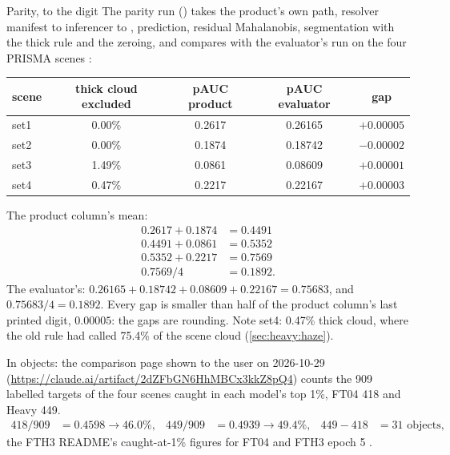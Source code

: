 \begin{worked}[label={we:heavy:parity}]{Parity, to the digit}
The parity run () takes the product's own path, resolver manifest to
inferencer to , prediction, residual Mahalanobis, segmentation with the thick rule and the zeroing,
and compares with the evaluator's run on the four PRISMA scenes :
\begin{center}\small
\begin{tabular}{lcccc}
\toprule
scene & thick cloud excluded & pAUC product & pAUC evaluator & gap\\
\midrule
set1 & 0.00\% & 0.2617 & 0.26165 & $+0.00005$\\
set2 & 0.00\% & 0.1874 & 0.18742 & $-0.00002$\\
set3 & 1.49\% & 0.0861 & 0.08609 & $+0.00001$\\
set4 & 0.47\% & 0.2217 & 0.22167 & $+0.00003$\\
\bottomrule
\end{tabular}
\end{center}
The product column's mean:
\begin{align*}
0.2617+0.1874 &= 0.4491\\
0.4491+0.0861 &= 0.5352\\
0.5352+0.2217 &= 0.7569\\
0.7569/4 &= 0.1892 .
\end{align*}
The evaluator's: $0.26165+0.18742+0.08609+0.22167=0.75683$, and $0.75683/4=0.1892$. Every gap is smaller than
half of the product column's last printed digit, $0.00005$: the gaps are rounding. Note set4: 0.47\% thick cloud,
where the old rule had called 75.4\% of the scene cloud (\cref{sec:heavy:haze}).
\end{worked}

In objects: the comparison page shown to the user on 2026-10-29 (\url{https://claude.ai/artifact/2dZFbGN6HhMBCx3kkZ8pQ4})
counts the 909 labelled targets of the four scenes caught in each model's top 1\%, FT04 418 and Heavy 449.
\begin{align*}
418/909 &= 0.4598 \to 46.0\%, & 449/909 &= 0.4939 \to 49.4\%, & 449-418 &= 31 \text{ objects,}
\end{align*}
the FTH3 README's caught-at-1\% figures for FT04 and FTH3 epoch 5 \tagC.


